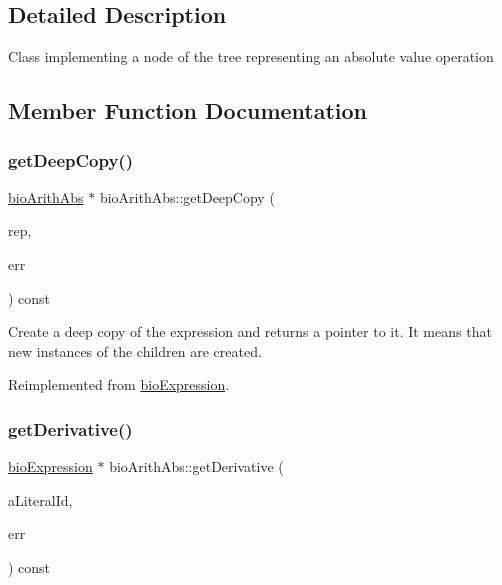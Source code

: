 \subsection{Detailed Description}
Class implementing a node of the tree representing an absolute value operation 

\subsection{Member Function Documentation}
\mbox{\label{classbio_arith_abs_a6b39360611c4dbb11ac38c501285c4b9}} 
\subsubsection{\texorpdfstring{get\+Deep\+Copy()}{getDeepCopy()}}
{\footnotesize\ttfamily \hyperlink{classbio_arith_abs}{bio\+Arith\+Abs} $\ast$ bio\+Arith\+Abs\+::get\+Deep\+Copy (\begin{DoxyParamCaption}\item[{\hyperlink{classbio_expression_repository}{bio\+Expression\+Repository} $\ast$}]{rep,  }\item[{pat\+Error $\ast$\&}]{err }\end{DoxyParamCaption}) const\hspace{0.3cm}{\ttfamily [virtual]}}

Create a deep copy of the expression and returns a pointer to it. It means that new instances of the children are created. 

Reimplemented from \hyperlink{classbio_expression_a4ee1b8add634078a02eaae26cd40dcc8}{bio\+Expression}.

\mbox{\label{classbio_arith_abs_a014621c263e720e52197b663f428e46d}} 
\subsubsection{\texorpdfstring{get\+Derivative()}{getDerivative()}}
{\footnotesize\ttfamily \hyperlink{classbio_expression}{bio\+Expression} $\ast$ bio\+Arith\+Abs\+::get\+Derivative (\begin{DoxyParamCaption}\item[{pat\+U\+Long}]{a\+Literal\+Id,  }\item[{pat\+Error $\ast$\&}]{err }\end{DoxyParamCaption}) const\hspace{0.3cm}{\ttfamily [virtual]}}

